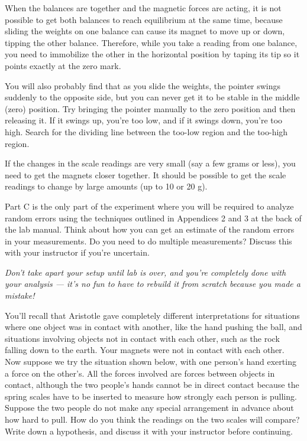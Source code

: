 When the balances are together and the magnetic forces are
acting, it is not possible to get both balances to reach
equilibrium at the same time, because sliding the weights on
one balance can cause its magnet to move up or down, tipping
the other balance.  Therefore, while you take a reading from
one balance, you need to immobilize the other in the
horizontal position by taping its tip so it points
exactly at the zero mark.

You will also probably find that as you slide the weights,
the pointer swings suddenly to the opposite side, but you
can never get it to be stable in the middle (zero) position.
 Try bringing the pointer manually to the zero position and
then releasing it.  If it swings up, you're too low, and if
it swings down, you're too high.  Search for the dividing
line between the too-low region and the too-high region.

If the changes in the scale readings are very small (say a
few grams or less), you need to get the magnets closer
together.  It should be possible to get the scale readings
to change by large amounts (up to 10 or 20 g).

Part C is the only part of the experiment where you will
be required to analyze random errors using the techniques
outlined in Appendices 2 and 3 at the back of the lab
manual.  Think about how you can get an estimate of the
random errors in your measurements. Do you need to do
multiple measurements? Discuss this with your instructor
if you're uncertain.

\emph{Don't take apart your setup until lab is over, and you're
completely done with your analysis --- it's no fun to have
to rebuild it from scratch because you made a mistake!}


You'll recall that Aristotle gave completely different
interpretations for situations where one object was in
contact with another, like the hand pushing the ball, and
situations involving objects not in contact with each other,
such as the rock falling down to the earth.  Your magnets
were not in contact with each other.  Now suppose we try the
situation shown below, with one person's hand exerting a
force on the other's.  All the forces involved are forces
between objects in contact, although the two people's hands
cannot be in direct contact because the spring scales have
to be inserted to measure how strongly each person is
pulling.  Suppose the two people do not make any special
arrangement in advance about how hard to pull.  How do you
think the readings on the two scales will compare?  Write
down a hypothesis, and discuss it with your instructor before continuing.

